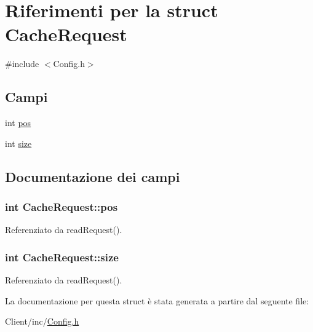 \hypertarget{structCacheRequest}{\section{Riferimenti per la struct Cache\+Request}
\label{structCacheRequest}
}


{\ttfamily \#include $<$Config.\+h$>$}

\subsection*{Campi}
\begin{DoxyCompactItemize}
\item 
int \hyperlink{structCacheRequest_a9b1e1f0498ee02f22da75fe915334873}{pos}
\item 
int \hyperlink{structCacheRequest_abc81e438c50064f3dde1835d6146bb1c}{size}
\end{DoxyCompactItemize}


\subsection{Documentazione dei campi}
\hypertarget{structCacheRequest_a9b1e1f0498ee02f22da75fe915334873}{
\subsubsection[{pos}]{\setlength{\rightskip}{0pt plus 5cm}int Cache\+Request\+::pos}}\label{structCacheRequest_a9b1e1f0498ee02f22da75fe915334873}


Referenziato da read\+Request().

\hypertarget{structCacheRequest_abc81e438c50064f3dde1835d6146bb1c}{
\subsubsection[{size}]{\setlength{\rightskip}{0pt plus 5cm}int Cache\+Request\+::size}}\label{structCacheRequest_abc81e438c50064f3dde1835d6146bb1c}


Referenziato da read\+Request().



La documentazione per questa struct è stata generata a partire dal seguente file\+:\begin{DoxyCompactItemize}
\item 
Client/inc/\hyperlink{Client_2inc_2Config_8h}{Config.\+h}\end{DoxyCompactItemize}

